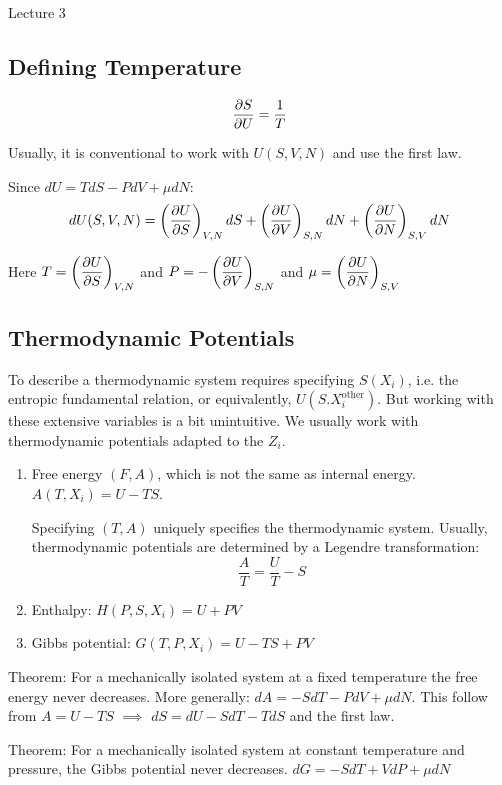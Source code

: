 \begin{center}

Lecture 3

\end{center}

\subsection{Defining Temperature}

$$\dfrac{\partial S}{\partial U} = \frac{1}{T}$$

Usually, it is conventional to work with $U(S,V,N)$ and use the first law. 

Since $dU = TdS - PdV + \mu dN$:
$$dU(S,V,N) = \left(\dfrac{\partial U}{\partial S}\right)_{V,N} dS + \left(\dfrac{\partial U}{\partial V}\right)_{S,N} dN + \left(\dfrac{\partial U}{\partial N}\right)_{S,V} dN$$

Here $T = \left(\dfrac{\partial U}{\partial S}\right)_{V,N}$ and $P = - \left(\dfrac{\partial U}{\partial V}\right)_{S,N}$ and $\mu = \left(\dfrac{\partial U}{\partial N}\right)_{S,V}$

\subsection{Thermodynamic Potentials}

To describe a thermodynamic system requires specifying $S(X_i)$, i.e. the entropic fundamental relation, or equivalently, $U(S. X_i^{\text{other}})$. But working with these extensive variables is a bit unintuitive. We usually work with thermodynamic potentials adapted to the $Z_i$.

\begin{enumerate}
\item Free energy $(F, A)$, which is not the same as internal energy. $A(T, X_i) = U - TS$.

Specifying $(T,A)$ uniquely specifies the thermodynamic system. Usually, thermodynamic potentials are determined by a Legendre transformation: $$\frac{A}{T} = \frac{U}{T} - S$$

\item Enthalpy: $H(P,S,X_i) = U + PV$
\item Gibbs potential: $G(T,P,X_i) = U - TS + PV$
\end{enumerate}

Theorem: For a mechanically isolated system at a fixed temperature the free energy never decreases. More generally: $dA = -S dT - PdV + \mu dN$. This follow from $A = U - TS$ $\implies$ $dS = dU - SdT - TdS$ and the first law.

Theorem: For a mechanically isolated system at constant temperature and pressure, the Gibbs potential never decreases. $dG = -S dT + VdP + \mu dN$

